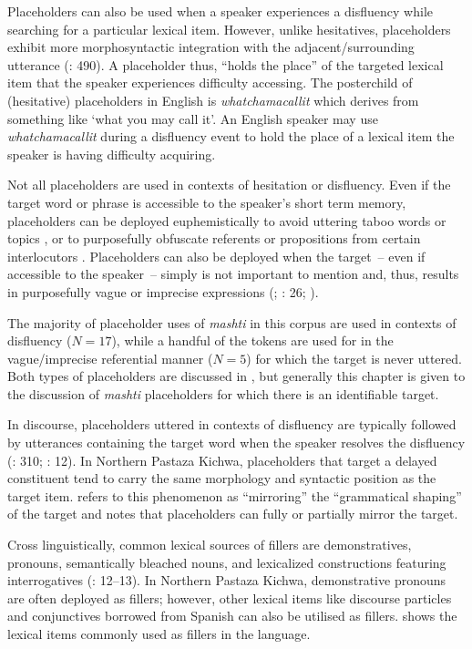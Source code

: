 \documentclass[output=paper]{langscibook}
\begin{document}
Placeholders can also be used when a speaker experiences a disfluency while searching for a particular lexical item. However, unlike hesitatives, placeholders exhibit more morphosyntactic integration with the adjacent/surrounding utterance (\citealt{HayashiYoon2006}: 490). A placeholder thus, “holds the place” of the targeted lexical item that the speaker experiences difficulty accessing. The posterchild of (hesitative) placeholders in English is \textit{whatchamacallit} which derives from something like ‘what you may call it’. An English speaker may use \textit{whatchamacallit} during a disfluency event to hold the place of a lexical item the speaker is having difficulty acquiring.

Not all placeholders are used in contexts of hesitation or disfluency. Even if the target word or phrase is accessible to the speaker’s short term memory, placeholders can be deployed euphemistically to avoid uttering taboo words or topics \citep{Enfield2003}, or to purposefully obfuscate referents or propositions from certain interlocutors \citep{AmiridzeGeorgian2010}. Placeholders can also be deployed when the target~-- even if accessible to the speaker~-- simply is not important to mention and, thus, results in purposefully vague or imprecise expressions (\citealt{PalaciosMartinez2015}; \citealt{Podlesskaya2010}: 26; \citealt{Seraku2022}).

The majority of placeholder uses of \textit{mashti} in this corpus are used in contexts of disfluency ($N=17$), while a handful of the tokens are used for in the vague\slash imprecise referential manner ($N=5$) for which the target is never uttered. Both types of placeholders are discussed in , but generally this chapter is given to the discussion of \textit{mashti} placeholders for which there is an identifiable target.

In discourse, placeholders uttered in contexts of disfluency are typically followed by utterances containing the target word when the speaker resolves the disfluency (\citealt{Keevallik2010}: 310; \citealt{Vallejos-Yopán2023}: 12). In Northern Pastaza Kichwa, placeholders that target a delayed constituent tend to carry the same morphology and syntactic position as the target item. \citet[18]{Podlesskaya2010} refers to this phenomenon as “mirroring” the “grammatical shaping” of the target and notes that placeholders can fully or partially mirror the target.

Cross linguistically, common lexical sources of fillers are demonstratives, pronouns, semantically bleached nouns, and lexicalized constructions featuring interrogatives (\citealt{Podlesskaya2010}: 12–13). In Northern Pastaza Kichwa, demonstrative pronouns are often deployed as fillers; however, other lexical items like discourse particles and conjunctives borrowed from Spanish can also be utilised as fillers.  shows the lexical items commonly used as fillers in the language.
\end{document}
